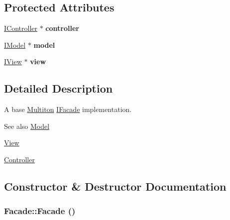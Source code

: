 \subsection*{Protected Attributes}
\begin{DoxyCompactItemize}
\item 
\hypertarget{class_pure_m_v_c_1_1_facade_a723b7009cf1ad2f305337477b1dd7e9e}{
\hyperlink{class_pure_m_v_c_1_1_i_controller}{IController} $\ast$ {\bfseries controller}}
\label{class_pure_m_v_c_1_1_facade_a723b7009cf1ad2f305337477b1dd7e9e}

\item 
\hypertarget{class_pure_m_v_c_1_1_facade_adc99b843a10c46e8312440d7e602a7bc}{
\hyperlink{class_pure_m_v_c_1_1_i_model}{IModel} $\ast$ {\bfseries model}}
\label{class_pure_m_v_c_1_1_facade_adc99b843a10c46e8312440d7e602a7bc}

\item 
\hypertarget{class_pure_m_v_c_1_1_facade_ae85cf2776afb840f3d46d6b0609c4f66}{
\hyperlink{class_pure_m_v_c_1_1_i_view}{IView} $\ast$ {\bfseries view}}
\label{class_pure_m_v_c_1_1_facade_ae85cf2776afb840f3d46d6b0609c4f66}

\end{DoxyCompactItemize}


\subsection{Detailed Description}
A base \hyperlink{class_pure_m_v_c_1_1_multiton}{Multiton} {\ttfamily \hyperlink{class_pure_m_v_c_1_1_i_facade}{IFacade}} implementation. \begin{DoxySeeAlso}{See also}
\hyperlink{class_pure_m_v_c_1_1_model}{Model} 

\hyperlink{class_pure_m_v_c_1_1_view}{View} 

\hyperlink{class_pure_m_v_c_1_1_controller}{Controller} 
\end{DoxySeeAlso}


\subsection{Constructor \& Destructor Documentation}
\hypertarget{class_pure_m_v_c_1_1_facade_a8e0f43c604499d9d603236929b3ac488}{
\subsubsection[{Facade}]{\setlength{\rightskip}{0pt plus 5cm}Facade::Facade ()}}
\label{class_pure_m_v_c_1_1_facade_a8e0f43c604499d9d603236929b3ac488}


